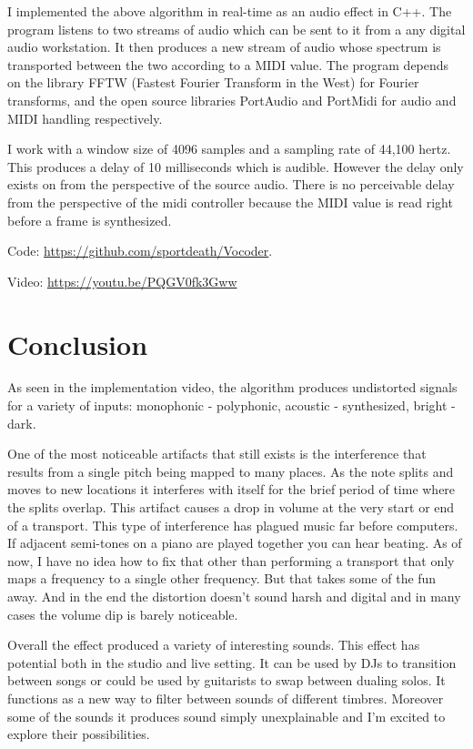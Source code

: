 \documentclass[12pt]{article}
\begin{document}
I implemented the above algorithm in real-time as an audio effect in C++.
The program listens to two streams of audio
which can be sent to it from a any digital audio workstation.
It then produces a new stream of audio 
whose spectrum is transported between the two
according to a MIDI value.
The program depends on the library FFTW (Fastest Fourier Transform in the West) \cite{fftw} for Fourier transforms, and the open source libraries PortAudio\cite{portaudio} and PortMidi\cite{portmidi} for audio and MIDI handling respectively.

I work with a window size of 4096 samples and a sampling rate of 44,100 hertz.
This produces a delay of 10 milliseconds which is audible.
However the delay only exists on from the perspective of the source audio.
There is no perceivable delay from the perspective of the midi controller 
because the MIDI value is read right before a frame is synthesized.

Code: \href{https://github.com/sportdeath/Vocoder}{https://github.com/sportdeath/Vocoder}.

Video:
\href{https://youtu.be/PQGV0fk3Gww}{https://youtu.be/PQGV0fk3Gww}

\section{Conclusion}

As seen in the implementation video, the algorithm produces undistorted signals for a variety of inputs: monophonic - polyphonic, acoustic  - synthesized, bright - dark.

One of the most noticeable artifacts that still exists is the interference that results from a single pitch being mapped to many places.
As the note splits and moves to new locations it interferes with itself for the brief period of time where the splits overlap.
This artifact causes a drop in volume at the very start or end of a transport.
This type of interference has plagued music far before computers.
If adjacent semi-tones on a piano are played together you can hear beating.
As of now, I have no idea how to fix that other than performing a transport that
only maps a frequency to a single other frequency.
But that takes some of the fun away.
And in the end the distortion doesn't sound harsh and digital and in many cases the volume dip is barely noticeable.

Overall the effect produced a variety of interesting sounds.
This effect has potential both in the studio and live setting. It can be used by DJs to transition between songs or could be used by guitarists to swap between dualing solos.
It functions as a new way to filter between sounds of different timbres.
Moreover some of the sounds it produces sound simply unexplainable and I'm excited to explore their possibilities.

\nocite{*}


\end{document}
